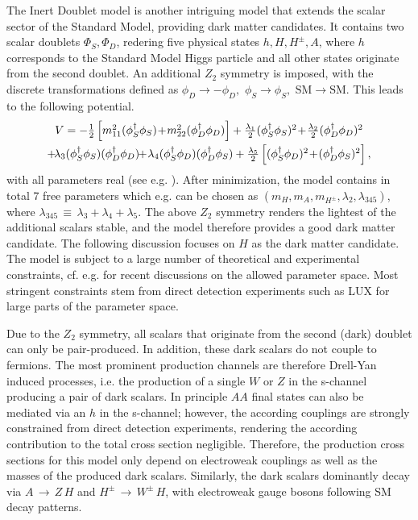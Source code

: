 The Inert Doublet model \cite{Deshpande:1977rw,Cao:2007rm,Barbieri:2006dq} is another intriguing model that extends the scalar sector of the Standard Model, providing dark matter candidates. It contains two scalar doublets $\Phi_S,\Phi_D$, redering five physical states $h,H,H^\pm,A$, where $h$ corresponds to the Standard Model Higgs particle and all other states originate from the second doublet. An additional $Z_2$ symmetry is imposed, with the discrete transformations defined as
$ \phi_D \to - \phi_D, \,\,
\phi_S\to \phi_S, \,\,
\text{SM} \to \text{SM}.$
This leads to the following potential. \begin{equation}\label{pot}\begin{array}{c}
V=-\fr{1}{2}\left[m_{11}^2(\phi_S^\dagger\phi_S)\!+\! m_{22}^2(\phi_D^\dagger\phi_D)\right]+
\fr{\lambda_1}{2}(\phi_S^\dagger\phi_S)^2\! 
+\!\fr{\lambda_2}{2}(\phi_D^\dagger\phi_D)^2\\[2mm]+\!\lambda_3(\phi_S^\dagger\phi_S)(\phi_D^\dagger\phi_D)\!
\!+\!\lambda_4(\phi_S^\dagger\phi_D)(\phi_D^\dagger\phi_S) +\fr{\lambda_5}{2}\left[(\phi_S^\dagger\phi_D)^2\!
+\!(\phi_D^\dagger\phi_S)^2\right],
\end{array}\end{equation}
with all  parameters real
(see e.g. \cite{Ginzburg:2010wa}).
After minimization, the model contains in total 7 free parameters which e.g. can be chosen as $(m_H,m_A,m_{H^{\pm}}, \lambda_2, \lambda_{345})$, where $\lambda_{345}\,\equiv\,\lambda_3+\lambda_4+\lambda_5$. The above $Z_2$ symmetry renders the lightest of the additional scalars stable, and the model therefore provides a good dark matter candidate. The following discussion focuses on $H$ as the dark matter candidate. The model is subject to a large number of theoretical and experimental constraints, cf. e.g. \cite{Dolle:2009ft,Swiezewska:2012eh,Arhrib:2013ela,Krawczyk:2013jta,Ilnicka:2015jba,Diaz:2015pyv,deFlorian:2016spz,Belyaev:2016lok,Ilnicka:2017gab,Eiteneuer:2017hoh} for recent discussions on the allowed parameter space. Most stringent constraints stem from direct detection experiments such as LUX \cite{Akerib:2016vxi} for large parts of the parameter space.

Due to the $Z_2$ symmetry, all scalars that originate from the second (dark) doublet can only be pair-produced. In addition, these dark scalars do not couple to fermions. The most prominent production channels are therefore Drell-Yan induced processes, i.e. the production of a single $W$ or $Z$ in the s-channel producing a pair of dark scalars. In principle $AA$ final states can also be mediated via an $h$ in the s-channel; however, the according couplings are strongly constrained from direct detection experiments, rendering the according contribution to the total cross section negligible. Therefore, the production cross sections for this model only depend on electroweak couplings as well as the masses of the produced dark scalars. Similarly, the dark scalars dominantly decay via $A\,\rightarrow\,Z\,H$ and $H^\pm\,\rightarrow\,W^\pm\,H$, with electroweak gauge bosons following SM decay patterns.

